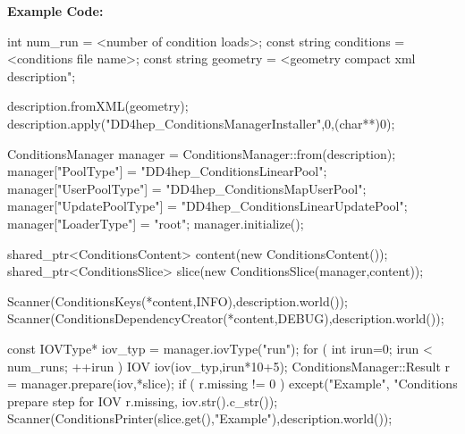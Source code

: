\documentclass[10pt,a4paper]{article}
\begin{document}
\vspace{0.6cm}

\noindent
{\bf{Example Code:}} \\

\begin{code}
  int          num_run    = <number of condition loads>;
  const string conditions = <conditions file name>;
  const string geometry   = <geometry compact xml description";

  description.fromXML(geometry);
  description.apply("DD4hep_ConditionsManagerInstaller",0,(char**)0);

  ConditionsManager manager = ConditionsManager::from(description);
  manager["PoolType"]       = "DD4hep_ConditionsLinearPool";
  manager["UserPoolType"]   = "DD4hep_ConditionsMapUserPool";
  manager["UpdatePoolType"] = "DD4hep_ConditionsLinearUpdatePool";
  manager["LoaderType"]     = "root";
  manager.initialize();

  shared_ptr<ConditionsContent> content(new ConditionsContent());
  shared_ptr<ConditionsSlice>   slice(new ConditionsSlice(manager,content));

  Scanner(ConditionsKeys(*content,INFO),description.world());
  Scanner(ConditionsDependencyCreator(*content,DEBUG),description.world());

  const IOVType* iov_typ = manager.iovType("run");
  for ( int irun=0; irun < num_runs; ++irun )  {
    IOV iov(iov_typ,irun*10+5);
    ConditionsManager::Result r = manager.prepare(iov,*slice);
    if ( r.missing != 0 )  {
       except("Example", 
              "Conditions prepare step for IOV %
              r.missing, iov.str().c_str());
    }
    Scanner(ConditionsPrinter(slice.get(),"Example"),description.world());
  }
\end{code}
\end{document}
